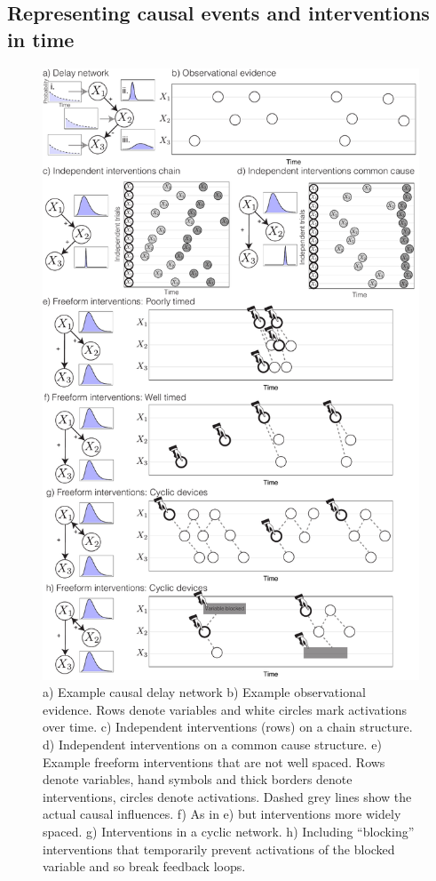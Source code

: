 \documentclass{cambridge7A}%
\begin{document}
\subsection{Representing causal events and interventions in time}


\begin{figure}[h!]
   \centering
   \includegraphics[width = .8\columnwidth]{DN}
   \caption{\scriptsize{a) Example causal delay network 
   b) Example observational evidence.  Rows denote variables and white circles mark activations over time.  c) Independent interventions (rows) on a chain structure. 
   d) Independent interventions on a common cause structure.  
   e) Example freeform interventions that are not well spaced.   Rows denote variables, hand symbols and thick borders denote interventions, circles denote activations.  Dashed grey lines show the actual causal influences.  f) As in e) but interventions more widely spaced.  g) Interventions in a cyclic network. h) Including ``blocking'' interventions that temporarily prevent activations of the blocked variable and so break feedback loops.}}
   \label{fig:DN}
\end{figure}
\end{document}
